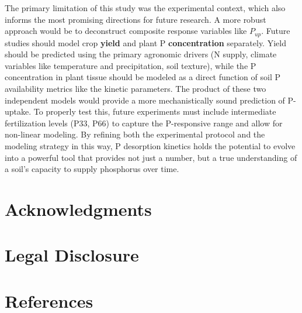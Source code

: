 \documentclass[
  a4paper,
]{article}
\begin{document}
The primary limitation of this study was the experimental context, which
also informs the most promising directions for future research. A more
robust approach would be to deconstruct composite response variables
like \(P_{up}\). Future studies should model crop \textbf{yield} and
plant P \textbf{concentration} separately. Yield should be predicted
using the primary agronomic drivers (N supply, climate variables like
temperature and precipitation, soil texture), while the P concentration
in plant tissue should be modeled as a direct function of soil P
availability metrics like the kinetic parameters. The product of these
two independent models would provide a more mechanistically sound
prediction of P-uptake. To properly test this, future experiments must
include intermediate fertilization levels (P33, P66) to capture the
P-responsive range and allow for non-linear modeling. By refining both
the experimental protocol and the modeling strategy in this way, P
desorption kinetics holds the potential to evolve into a powerful tool
that provides not just a number, but a true understanding of a soil's
capacity to supply phosphorus over time.

\section{Acknowledgments}\label{acknowledgments}

\section{Legal Disclosure}\label{legal-disclosure}

\newpage

\section{References}\label{references}
\end{document}

